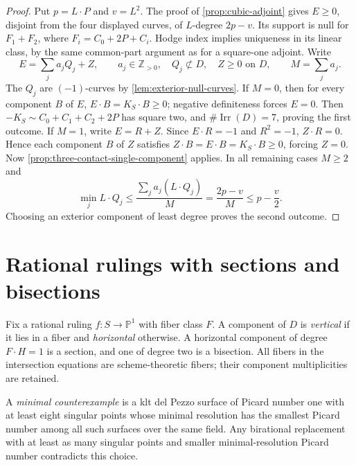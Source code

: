 \documentclass[11pt,reqno]{amsart}
\theoremstyle{definition}
\theoremstyle{remark}
\DeclareMathOperator{\Irr}{Irr}
\newcommand{\PP}{\mathbb P}
\newcommand{\ZZ}{\mathbb Z}
\numberwithin{equation}{section}
\begin{document}
\begin{proof}
Put $p=L\cdot P$ and $v=L^2$.
The proof of
\cref{prop:cubic-adjoint} gives
$E\ge0$, disjoint from the four displayed curves, of $L$-degree
$2p-v$. Its support is null for $F_1+F_2$, where
$F_i=C_0+2P+C_i$. Hodge index implies uniqueness in its linear
class, by the same common-part argument as for a square-one adjoint.
Write
\[
 E=\sum_j a_jQ_j+Z,\qquad
 a_j\in\ZZ_{>0},\quad Q_j\not\subset D,\quad Z\ge0\text{ on }D,
 \qquad M=\sum_j a_j.
\]
The $Q_j$ are $(-1)$-curves by
\cref{lem:exterior-null-curves}.
If $M=0$, then for every component $B$ of $E$,
$E\cdot B=K_S\cdot B\ge0$; negative definiteness forces $E=0$.
Then $-K_S\sim C_0+C_1+C_2+2P$ has square two, and
$\#\Irr(D)=7$, proving the first outcome.
If $M=1$, write $E=R+Z$. Since $E\cdot R=-1$ and $R^2=-1$,
$Z\cdot R=0$. Hence each component $B$ of $Z$ satisfies
$Z\cdot B=E\cdot B=K_S\cdot B\ge0$, forcing $Z=0$.
Now \cref{prop:three-contact-single-component} applies.
In all remaining cases $M\ge2$ and
\[
 \min_j L\cdot Q_j\le
 \frac{\sum_j a_j(L\cdot Q_j)}{M}
 =\frac{2p-v}{M}\le p-\frac v2.
\]
Choosing an exterior component of least degree
proves the second outcome.
\end{proof}


\section{Rational rulings with sections and bisections}
\label{sec:rulings}
Fix a rational ruling $f:S\to\PP^1$ with fiber class $F$.
A component of $D$ is \emph{vertical} if it lies in a fiber and
\emph{horizontal} otherwise. A horizontal component of degree
$F\cdot H=1$ is a section, and one of degree two is a bisection.
All fibers in the intersection equations are scheme-theoretic fibers;
their component multiplicities are retained.

A
\emph{minimal counterexample} is a klt del Pezzo surface of Picard
number one with at least eight singular points whose minimal
resolution has the smallest Picard number among all such surfaces
over the same field. Any birational replacement with at least as
many singular points and smaller minimal-resolution Picard number
contradicts this choice.
\end{document}
